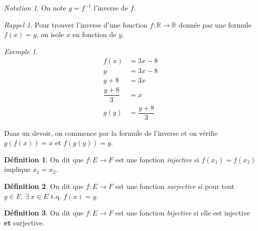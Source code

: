 \documentclass{report}
\theoremstyle{definition}
\newtheorem*{defin}{D\'efinition}
\theoremstyle{remark}
\newtheorem*{exem}{Exemple}
\newtheorem*{nota}{Notation}
\newtheorem*{rappel}{Rappel}
\begin{document}
	\begin{nota}
		On note $g=f^{-1}$ l'inverse de $f$.
	\end{nota}


	\begin{rappel}
		Pour trouver l'inverse d'une fonction $f:\mathbb{R} \to \mathbb{R}$ donn\'ee par une formule $f(x)=y$, on isole $x$ en fonction de $y$.
	\end{rappel}


	\begin{exem}
		\begin{align*}
			f(x)&= 3x-8\\
			y&= 3x-8\\
			y+8&= 3x\\
			\dfrac{y+8}{3}&= x\\
			g(y)&= \dfrac{y+8}{3}
		\end{align*}

		Dans un devoir, on commence par la formule de l'inverse et on v\'erifie $g(f(x))=x$ et $f(g(y))=y$.
	\end{exem}

	\begin{defin}
		On dit que $f:E \to F$ est une fonction \emph{injective} si $f(x_1)=f(x_2)$ implique $x_1=x_2$.
	\end{defin}

	\begin{defin}
		On dit que $f:E \to F$ est une fonction \emph{surjective} si pour tout $y \in F,~\exists~x \in E$ t.q. $f(x)=y$.
	\end{defin}

	\begin{defin}
		On dit que $f:E \to F$ est une fonction \emph{bijective} si elle est injective \textbf{et} surjective.
	\end{defin}
\end{document}
